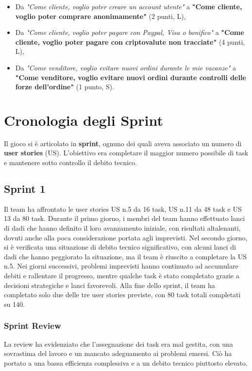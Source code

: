 \documentclass{article}
\begin{document}
\begin{itemize}
    \item Da \textit{"Come cliente, voglio poter creare un account utente"} a 
      \textbf{"Come cliente, voglio poter comprare anonimamente"} (2 punti, L),

    \item Da \textit{"Come cliente, voglio poter pagare con Paypal, Visa o bonifico"} 
      a \textbf{"Come cliente, voglio poter pagare con criptovalute non tracciate"} (4 punti, L),

    \item Da \textit{"Come venditore, voglio evitare nuovi ordini durante le mie vacanze"} 
      a \textbf{"Come venditore, voglio evitare nuovi ordini durante controlli delle forze dell'ordine"} (1 punto, S).
\end{itemize}

\section*{Cronologia degli Sprint}

Il gioco si è articolato in \textbf{sprint}, ognuno dei quali aveva associato un 
numero di \textbf{user stories} (US). L'obiettivo era completare il maggior 
numero possibile di task e mantenere sotto controllo il debito tecnico.

\subsection*{Sprint 1}
Il team ha affrontato le user stories US n.5 da 16 task, US n.11 da 48 task e US 
13 da 80 task. Durante il primo giorno, i membri del team hanno effettuato lanci 
di dadi che hanno definito il loro avanzamento iniziale, con risultati altalenanti, 
dovuti anche alla poca considerazione portata agli imprevisti. Nel secondo giorno, 
si è verificata una situazione di debito tecnico significativo, con alcuni lanci 
di dadi che hanno peggiorato la situazione, ma il team è riuscito a completare 
la US n.5. Nei giorni successivi, problemi imprevisti hanno continuato ad 
accumulare debiti e rallentare il progresso, mentre qualche task è stato 
completato grazie a decisioni strategiche e lanci favorevoli. Alla fine dello 
sprint, il team ha completato solo due delle tre user stories previste, con 80 
task totali completati su 140. 

\subsubsection*{Sprint Review}  
La review ha evidenziato che l'assegnazione dei task era mal gestita, con una 
sovrastima del lavoro e un mancato adeguamento ai problemi emersi. Ciò ha 
portato a una bassa efficienza complessiva e a un debito tecnico piuttosto elevato.
\end{document}
